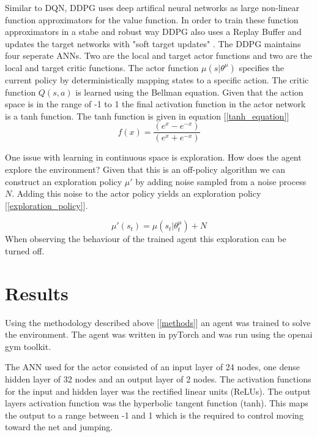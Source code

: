 \documentclass[12pt]{article}
\begin{document}
Similar to DQN, DDPG uses deep artifical neural networks as large non-linear function approximators for the value function.
In order to train these function approximators in a stabe and robust way DDPG also uses a Replay Buffer\cite{experience_replay} and updates the target networks with "soft target updates" \cite{ddpg_paper}.
The DDPG maintains four seperate ANNs.
Two are the local and target actor functions and two are the local and target critic functions.
The actor function $\mu(s|\theta^{\mu})$ specifies the current policy by deterministically mapping states to a specific action.
The critic function $Q(s,a)$ is learned using the Bellman equation.
Given that the action space is in the range of -1 to 1 the final activation function in the actor network is a tanh function.
The tanh function is given in equation [\ref{tanh_equation}]
\begin{equation}
\label{tanh_equation}
f(x) = \frac{(e^x - e^{-x})}{(e^x+e^{-x})}
\end{equation}

One issue with learning in continuous space is exploration.
How does the agent explore the environment?
Given that this is an off-policy algorithm we can construct an exploration policy $\mu'$ by adding noise sampled from a noise process $N$.
Adding this noise to the actor policy yields an exploration policy [\ref{exploration_policy}].

\begin{equation}
\label{exploration_policy}
\mu'(s_t) = \mu(s_t|\theta_t^\mu) + N
\end{equation}
When observing the behaviour of the trained agent this exploration can be turned off.

\section{Results}
Using the methodology described above [\ref{methods}] an agent was trained to solve the environment.
The agent was written in pyTorch and was run using the openai gym toolkit.

The ANN used for the actor consisted of an input layer of 24 nodes, one dense hidden layer of 32 nodes and an output layer of 2 nodes.
The activation functions for the input and hidden layer was the rectified linear units (ReLUs). 
The output layers activation function was the hyperbolic tangent function (tanh). 
This maps the output to a range between -1 and 1 which is the required to control moving toward the net and jumping.
\end{document}
